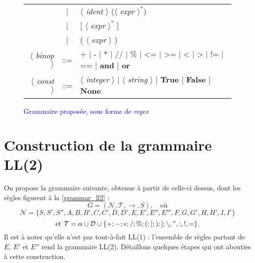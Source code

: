 \documentclass[a4paper, 12pt]{report}
\begin{document}
\begin{figure}[!h]
\begin{center}
{\begin{tabular}{rcl}
& | & $\langle$ \textit{ident} $\rangle$ ($\langle$ \textit{expr} $\rangle^*$)\\
& | & [ $\langle$ \textit{expr} $\rangle^*$ ]\\
& | & ( $\langle$ \textit{expr} $\rangle$ )\\
$\langle$ \textit{binop} $\rangle$ & ::= &+ | - | * | // | \% | <= | >= | < | > | != | == | \textbf{and} | \textbf{or} \\
$\langle$ \textit{const} $\rangle$ & ::= & $\langle$ \textit{integer} $\rangle$ | $\langle$ \textit{string} $\rangle$ | \textbf{True} | \textbf{False} | \textbf{None}
\end{tabular}
}
\caption{\textcolor{blue}{Grammaire proposée, sous forme de \textit{regex}}}
\label{grammar_with_regex}
\end{center}\end{figure}

\section{Construction de la grammaire LL(2)}

On propose la grammaire suivante, obtenue à partir de celle-ci dessus, dont les règles figurent à la \figurename \space \ref{grammar_ll2} :
\[ G = ( \mathcal{N}, \mathcal{T}, \to, S), \quad \text{où}\]
\[  \mathcal{N} = \lbrace S,S',S'',A,B,B',C,C',D,D',E,E',E'',E''',F,G,G',H,H',I,I' \rbrace \]
\[ \text{et } \mathcal{T} = \alpha \cup \mathcal{D} \cup \lbrace +;-;*;/;\%;(;[;);];\backslash, ",:,!,=\rbrace.\]
Il est à noter qu'elle n'est pas tout-à-fait LL(1) : l'ensemble de règles partant de $E$, $E'$ et $E''$ rend la grammaire LL(2). Détaillons quelques étapes qui ont abouties à cette construction.\\
\end{document}
